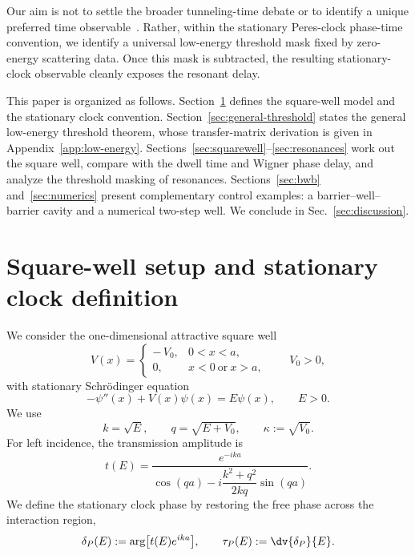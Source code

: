 \documentclass[aps,pra,preprint,notitlepage,nofootinbib]{revtex4-2}
\begin{document}
Our aim is not to settle the broader tunneling-time debate or to identify a
unique preferred time observable~\cite{Hauge1989,LandauerMartin1994,
MugaLeavens2000,Winful2006,Field2022,Sokolovski2017}.
Rather, within the stationary Peres-clock phase-time convention, we identify a
universal low-energy threshold mask fixed by zero-energy scattering data. Once
this mask is subtracted, the resulting stationary-clock observable cleanly
exposes the resonant delay.

This paper is organized as follows. Section~\ref{sec:model} defines the square-well model and the stationary clock convention. Section~\ref{sec:general-threshold} states the general low-energy threshold theorem, whose transfer-matrix derivation is given in Appendix~\ref{app:low-energy}. Sections~\ref{sec:squarewell}--\ref{sec:resonances} work out the square well, compare with the dwell time and Wigner phase delay, and analyze the threshold masking of resonances. Sections~\ref{sec:bwb} and~\ref{sec:numerics} present complementary control examples: a barrier--well--barrier cavity and a numerical two-step well. We conclude in Sec.~\ref{sec:discussion}.



\section{Square-well setup and stationary clock definition}
\label{sec:model}

We consider the one-dimensional attractive square well
\begin{equation}
V(x)=
\begin{cases}
-\,V_0, & 0<x<a,\\
0, & x<0 \ \text{or}\ x>a,
\end{cases}
\qquad V_0>0,
\label{eq:V-squarewell}
\end{equation}
with stationary Schr\"odinger equation
\begin{equation}
-\psi''(x)+V(x)\psi(x)=E\psi(x),
\qquad E>0.
\label{eq:Sch-eq}
\end{equation}
We use
\begin{equation}
k=\sqrt{E},
\qquad
q=\sqrt{E+V_0},
\qquad
\kappa:=\sqrt{V_0}.
\label{eq:kq-def}
\end{equation}
For left incidence, the transmission amplitude is
\begin{equation}
t(E)=\frac{e^{-ika}}
{\cos(qa)-i\dfrac{k^2+q^2}{2kq}\sin(qa)}.
\label{eq:t-squarewell}
\end{equation}
We define the stationary clock phase by restoring the free phase across the interaction region,
\begin{equation}
\delta_P(E):=\arg\!\big[t(E)e^{ika}\big],
\qquad
\tau_P(E):=\dv{\delta_P}{E}.
\label{eq:Peres-def}
\end{equation}
\end{document}
